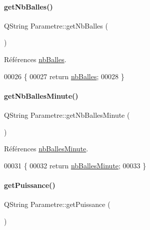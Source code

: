 \paragraph{\texorpdfstring{get\+Nb\+Balles()}{getNbBalles()}}
{\footnotesize\ttfamily Q\+String Parametre\+::get\+Nb\+Balles (\begin{DoxyParamCaption}{ }\end{DoxyParamCaption})}



Références \hyperlink{class_parametre_a0423730a9146df04ba4de3f733818e45}{nb\+Balles}.


\begin{DoxyCode}
00026 \{
00027     \textcolor{keywordflow}{return} \hyperlink{class_parametre_a0423730a9146df04ba4de3f733818e45}{nbBalles};
00028 \}
\end{DoxyCode}
\mbox{\label{class_parametre_a5b365053ce5325ec951c837463826774}} 
\paragraph{\texorpdfstring{get\+Nb\+Balles\+Minute()}{getNbBallesMinute()}}
{\footnotesize\ttfamily Q\+String Parametre\+::get\+Nb\+Balles\+Minute (\begin{DoxyParamCaption}{ }\end{DoxyParamCaption})}



Références \hyperlink{class_parametre_a6d2be86cf41aef4e099b0a7421c735c8}{nb\+Balles\+Minute}.


\begin{DoxyCode}
00031 \{
00032     \textcolor{keywordflow}{return} \hyperlink{class_parametre_a6d2be86cf41aef4e099b0a7421c735c8}{nbBallesMinute};
00033 \}
\end{DoxyCode}
\mbox{\label{class_parametre_a11d2ada45a77abb2e99f9cde1c2d352d}} 
\paragraph{\texorpdfstring{get\+Puissance()}{getPuissance()}}
{\footnotesize\ttfamily Q\+String Parametre\+::get\+Puissance (\begin{DoxyParamCaption}{ }\end{DoxyParamCaption})}



